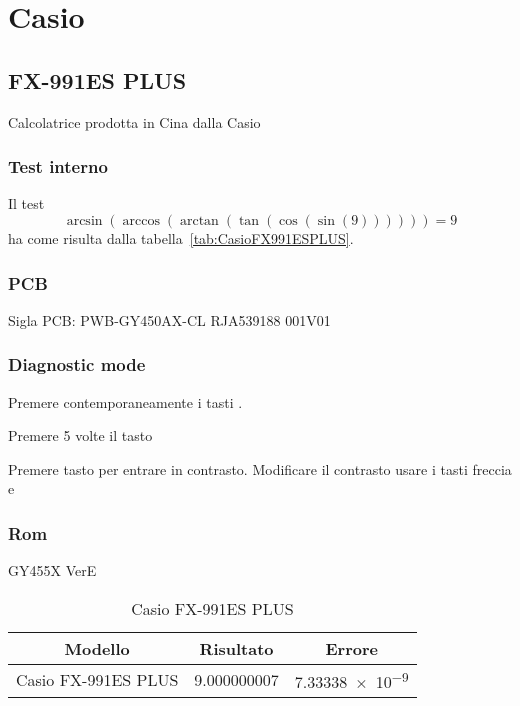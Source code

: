 \chapter{Casio}
\section{FX-991ES PLUS}
Calcolatrice prodotta in Cina dalla Casio~\cite{Wikipedia2021}
\subsection{Test interno}
Il test\[\arcsin(\arccos(\arctan(\tan(\cos(\sin(9))))))=9\] ha come risulta dalla tabella~\vref{tab:CasioFX991ESPLUS}. 
\subsection{PCB}
Sigla PCB: PWB-GY450AX-CL RJA539188 001V01
\subsection{Diagnostic mode}
Premere contemporaneamente i tasti \tastoshift\tastoON{}.

Premere 5 volte il tasto \tastoshift

Premere tasto \tastoAC per entrare in contrasto. Modificare il contrasto usare i tasti freccia \tastoFrecciaSinistra e \tastoFrecciaDestro
\subsection{Rom}
GY455X VerE

\begin{table}
	\centering
	\begin{tabular}{lll}
		\toprule
		\multicolumn{1}{c}{Modello}&\multicolumn{1}{c}{Risultato}&\multicolumn{1}{c}{Errore}\\
		\midrule
		Casio FX-991ES PLUS&\num{9.000000007}&\num{7.33338e-9}\\
		\bottomrule
	\end{tabular} 
	\caption{Casio FX-991ES PLUS}
	\label{tab:CasioFX991ESPLUS}
\end{table}